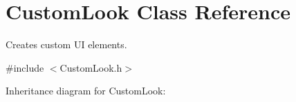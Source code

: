\hypertarget{class_custom_look}{}\section{Custom\+Look Class Reference}
\label{class_custom_look}


Creates custom UI elements.  




{\ttfamily \#include $<$Custom\+Look.\+h$>$}



Inheritance diagram for Custom\+Look\+:
